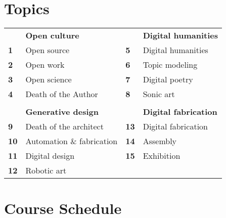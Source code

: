 \documentclass[11pt,article,oneside]{memoir}
\begin{document}

\section{Topics}
%
\begin{table}[H]
\begin{tabular}{l l @{\hskip 2cm} l l}
\small
\vspace*{0.25cm}
& \textbf{Open culture} && \textbf{Digital humanities} \\
\textbf{1} & Open source & \textbf{5} & Digital humanities \\
\textbf{2} & Open work & \textbf{6} & Topic modeling \\
\textbf{3} & Open science & \textbf{7} & Digital poetry \\
\textbf{4} & Death of the Author & \textbf{8} & Sonic art \\
\\
\vspace*{0.25cm}
& \textbf{Generative design} && \textbf{Digital fabrication} \\
\textbf{9} & Death of the architect & \textbf{13} & Digital fabrication \\
\textbf{10} & Automation \& fabrication & \textbf{14} & Assembly\\
 \textbf{11} & Digital design & \textbf{15} & Exhibition\\
 \textbf{12} & Robotic art\\
%
\end{tabular}
\end{table}

\clearpage

\section{Course Schedule}
\end{document}
